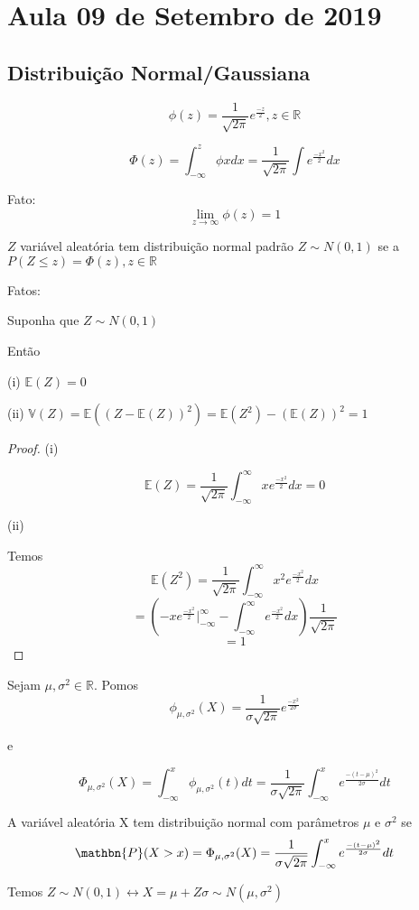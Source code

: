 \section{Aula 09 de Setembro de 2019}
\label{2019_09_09}
\subsection{Distribuição Normal/Gaussiana}

\[
\phi(z) = \frac{1}{\sqrt{2\pi}}e^\frac{-z}{2}, z \in \mathbb{R}
\]

\[
\Phi(z) = \int_{-\infty}^z \phi x dx = \frac{1}{\sqrt{2\pi}} \int e^\frac{-x^2}{2}dx
\]

Fato:
$$\lim_{z\to\infty} \phi(z) = 1$$ 

$Z$ variável aleatória tem distribuição normal padrão $Z\sim N(0,1)$ se a $P(Z\leq z) = \Phi(z), z \in \mathbb{R}$

Fatos:

Suponha que $Z\sim N(0,1)$

Então

(i) $\mathbb{E}(Z) = 0$

(ii) $\mathbb{V}(Z) = \mathbb{E}((Z-\mathbb{E}(Z))^2) = \mathbb{E}(Z^2)-(\mathbb{E}(Z))^2 = 1$ 


\begin{proof}

(i)

\[
\mathbb{E}(Z) = \frac{1}{\sqrt{2\pi}} \int_{-\infty}^\infty xe^\frac{-x^2}{2}dx = 0
\]

(ii)

Temos
\[
\mathbb{E}(Z^2) = \frac{1}{\sqrt{2\pi}} \int_{-\infty}^\infty x^2 e^\frac{-x^2}{2}dx 
\]
\[
= (-xe^\frac{-x^2}{2}\Big|_{-\infty}^\infty - \int_{-\infty}^\infty e^\frac{-x^2}{2}dx)\frac{1}{\sqrt{2\pi}}
\]
\[=1\]
\end{proof}

Sejam $\mu,\sigma^2\in\mathbb{R}$. Pomos
\[\phi_{\mu,\sigma^2}(X) = \frac{1}{\sigma\sqrt{2\pi}}e^\frac{-x^2}{2\sigma}\]

e

\[\Phi_{\mu,\sigma^2}(X) =\int_{-\infty}^x \phi_{\mu,\sigma^2}(t)dt = \frac{1}{\sigma\sqrt{2\pi}}\int_{-\infty}^x e^\frac{-(t-\mu)^2}{2\sigma}dt\]

A variável aleatória X tem distribuição normal com parâmetros $\mu$ e $\sigma^2$ se
\[\mathbn{P}(X>x) = \Phi_{\mu,\sigma^2}(X) = \frac{1}{\sigma\sqrt{2\pi}}\int_{-\infty}^x e^\frac{-(t-\mu)^2}{2\sigma}dt\]

Temos $Z\sim N(0,1) \leftrightarrow X = \mu + Z\sigma \sim N(\mu,\sigma^2)$

